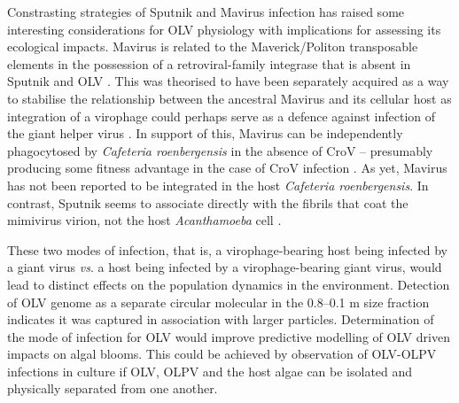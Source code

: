 Constrasting strategies of Sputnik and Mavirus infection has raised some interesting considerations for \ac{OLV} physiology with implications for assessing its ecological impacts.
Mavirus is related to the Maverick/Politon transposable elements in the possession of a retroviral-family integrase that is absent in Sputnik and \ac{OLV} \cite{Fischer2011a}.
This was theorised to have been separately acquired as a way to stabilise the relationship between the ancestral Mavirus and its cellular host as integration of a virophage could perhaps serve as a defence against infection of the giant helper virus \cite{Fischer2011a}.
In support of this, Mavirus can be independently phagocytosed by \emph{Cafeteria roenbergensis} in the absence of \ac{CroV} -- presumably producing some fitness advantage in the case of \ac{CroV} infection \cite{Fischer2011a}.
As yet, Mavirus has not been reported to be integrated in the host \emph{Cafeteria roenbergensis}.
In contrast, Sputnik seems to associate directly with the fibrils that coat the mimivirus virion, not the host \emph{Acanthamoeba} cell \cite{Boyer2011}.

These two modes of infection, that is, a virophage-bearing host being infected by a giant virus \emph{vs}. a host being infected by a virophage-bearing giant virus, would lead to distinct effects on the population dynamics in the environment.
Detection of \ac{OLV} genome as a separate circular molecular in the 0.8--0.1 \textmu{}m size fraction indicates it was captured in association with larger particles.
Determination of the mode of infection for \ac{OLV} would improve predictive modelling of \ac{OLV} driven impacts on algal blooms.
This could be achieved by observation of \ac{OLV}-\ac{OLPV} infections in culture if \ac{OLV}, \ac{OLPV} and the host algae can be isolated and physically separated from one another.


